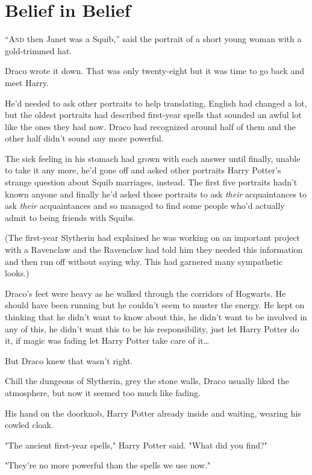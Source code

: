 \chapter{Belief in Belief}

\lettrine{“A}{nd} then Janet was a Squib,'' said the portrait of a short young woman with a
gold-trimmed hat.

Draco wrote it down. That was only twenty-eight but it was time to go back and
meet Harry.

He'd needed to ask other portraits to help translating, English had changed a
lot, but the oldest portraits had described first-year spells that sounded an
awful lot like the ones they had now. Draco had recognized around half of them
and the other half didn't sound any more powerful.

The sick feeling in his stomach had grown with each answer until finally,
unable to take it any more, he'd gone off and asked other portraits Harry
Potter's strange question about Squib marriages, instead. The first five
portraits hadn't known anyone and finally he'd asked those portraits to ask
\emph{their} acquaintances to ask \emph{their} acquaintances and so managed to
find some people who'd actually admit to being friends with Squibs.

(The first-year Slytherin had explained he was working on an important project
with a Ravenclaw and the Ravenclaw had told him they needed this information
and then run off without saying why. This had garnered many sympathetic looks.)

Draco's feet were heavy as he walked through the corridors of Hogwarts. He
should have been running but he couldn't seem to muster the energy. He kept on
thinking that he didn't want to know about this, he didn't want to be involved
in any of this, he didn't want this to be his responsibility, just let Harry
Potter do it, if magic was fading let Harry Potter take care of it{\ldots}

But Draco knew that wasn't right.

Chill the dungeons of Slytherin, grey the stone walls, Draco usually liked the
atmosphere, but now it seemed too much like fading.

His hand on the doorknob, Harry Potter already inside and waiting, wearing his
cowled cloak.

"The ancient first-year spells," Harry Potter said. "What did you find?"

"They're no more powerful than the spells we use now."

